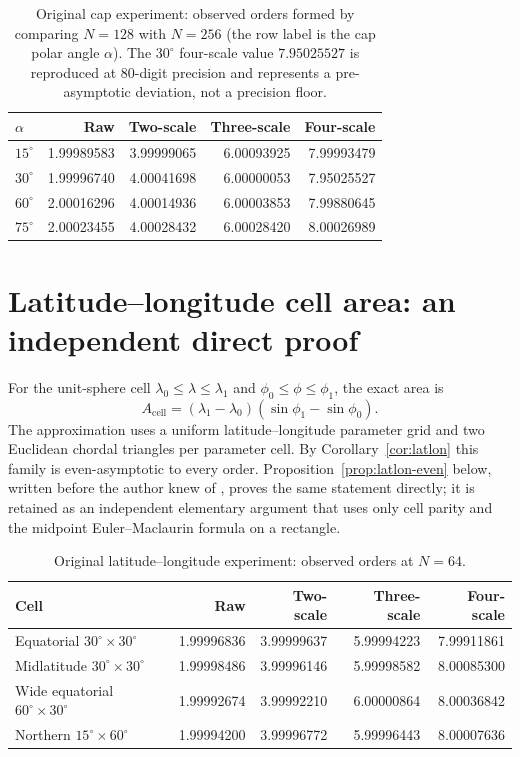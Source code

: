 \documentclass[11pt]{article}
\theoremstyle{remark}
\begin{document}
\begin{table}[ht]
\centering
\begin{tabular}{lrrrr}
\toprule
$\alpha$ & Raw & Two-scale & Three-scale & Four-scale\\
\midrule
$15^\circ$ & 1.99989583 & 3.99999065 & 6.00093925 & 7.99993479\\
$30^\circ$ & 1.99996740 & 4.00041698 & 6.00000053 & 7.95025527\\
$60^\circ$ & 2.00016296 & 4.00014936 & 6.00003853 & 7.99880645\\
$75^\circ$ & 2.00023455 & 4.00028432 & 6.00028420 & 8.00026989\\
\bottomrule
\end{tabular}
\caption{Original cap experiment: observed orders formed by comparing $N=128$ with $N=256$
(the row label is the cap polar angle $\alpha$). The $30^\circ$ four-scale value $7.95025527$
is reproduced at 80-digit precision and represents a pre-asymptotic deviation, not a precision
floor.}\label{tab:cap}
\end{table}

\section{Latitude--longitude cell area: an independent direct proof}\label{sec:latlon}
For the unit-sphere cell $\lambda_0\le\lambda\le\lambda_1$ and $\phi_0\le\phi\le\phi_1$, the
exact area is
\[
A_{\mathrm{cell}}=(\lambda_1-\lambda_0)(\sin\phi_1-\sin\phi_0).
\]
The approximation uses a uniform latitude--longitude parameter grid and two Euclidean chordal
triangles per parameter cell. By Corollary~\ref{cor:latlon} this family is even-asymptotic to
every order. Proposition~\ref{prop:latlon-even} below, written before the author knew of
\cite{verlindencools,lyness94}, proves the same statement directly; it is retained as an
independent elementary argument that uses only cell parity and the midpoint Euler--Maclaurin
formula on a rectangle.

\begin{table}[ht]
\centering
\begin{tabular}{lrrrr}
\toprule
Cell & Raw & Two-scale & Three-scale & Four-scale\\
\midrule
Equatorial $30^\circ\times30^\circ$ & 1.99996836 & 3.99999637 & 5.99994223 & 7.99911861\\
Midlatitude $30^\circ\times30^\circ$ & 1.99998486 & 3.99996146 & 5.99998582 & 8.00085300\\
Wide equatorial $60^\circ\times30^\circ$ & 1.99992674 & 3.99992210 & 6.00000864 & 8.00036842\\
Northern $15^\circ\times60^\circ$ & 1.99994200 & 3.99996772 & 5.99996443 & 8.00007636\\
\bottomrule
\end{tabular}
\caption{Original latitude--longitude experiment: observed orders at $N=64$.}\label{tab:latlon}
\end{table}
\end{document}
